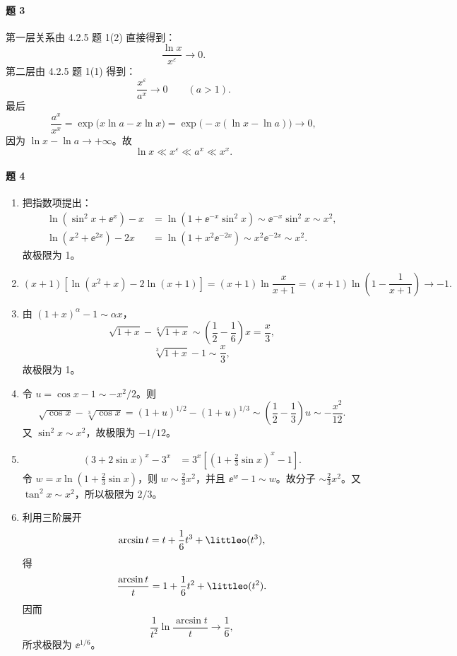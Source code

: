 \paragraph{题 3}
\begin{xsolution}
第一层关系由 4.2.5 题 1(2) 直接得到：
\[
  \frac{\ln x}{x^\varepsilon}\to0.
\]
第二层由 4.2.5 题 1(1) 得到：
\[
  \frac{x^\varepsilon}{a^x}\to0\qquad(a>1).
\]
最后
\[
  \frac{a^x}{x^x}
  =\exp\bigl(x\ln a-x\ln x\bigr)
  =\exp\bigl(-x(\ln x-\ln a)\bigr)\to0,
\]
因为 $\ln x-\ln a\to+\infty$。故
\[
  \ln x\ll x^\varepsilon\ll a^x\ll x^x.
\]
\end{xsolution}

\paragraph{题 4}
\begin{xsolution}
\begin{enumerate}[label=(\arabic*)]
  \item 把指数项提出：
  \begin{align*}
    \ln(\sin^2x+\ee^x)-x
    &=\ln(1+\ee^{-x}\sin^2x)
      \sim\ee^{-x}\sin^2x\sim x^2,\\
    \ln(x^2+\ee^{2x})-2x
    &=\ln(1+x^2\ee^{-2x})
      \sim x^2\ee^{-2x}\sim x^2.
  \end{align*}
  故极限为 1。

  \item
  \[
    (x+1)[\ln(x^2+x)-2\ln(x+1)]
    =(x+1)\ln\frac{x}{x+1}
    =(x+1)\ln\left(1-\frac1{x+1}\right)\to-1.
  \]

  \item 由 $(1+x)^\alpha-1\sim\alpha x$，
  \[
    \sqrt{1+x}-\sqrt[6]{1+x}
    \sim\left(\frac12-\frac16\right)x=\frac x3,
  \]
  \[
    \sqrt[3]{1+x}-1\sim\frac x3,
  \]
  故极限为 1。

  \item 令 $u=\cos x-1\sim-x^2/2$。则
  \[
    \sqrt{\cos x}-\sqrt[3]{\cos x}
    =(1+u)^{1/2}-(1+u)^{1/3}
    \sim\left(\frac12-\frac13\right)u
    \sim-\frac{x^2}{12}.
  \]
  又 $\sin^2x\sim x^2$，故极限为 $-1/12$。

  \item
  \begin{align*}
    (3+2\sin x)^x-3^x
    &=3^x\left[\left(1+\frac23\sin x\right)^x-1\right].
  \end{align*}
  令
  $w=x\ln(1+\frac23\sin x)$，则 $w\sim\frac23x^2$，并且 $\ee^w-1\sim w$。故分子
  $\sim\frac23x^2$。又 $\tan^2x\sim x^2$，所以极限为 $2/3$。

  \item 利用三阶展开
  \[
    \arcsin t=t+\frac16t^3+\littleo(t^3),
  \]
  得
  \[
    \frac{\arcsin t}{t}=1+\frac16t^2+\littleo(t^2).
  \]
  因而
  \[
    \frac1{t^2}\ln\frac{\arcsin t}{t}\to\frac16,
  \]
  所求极限为 $\ee^{1/6}$。
\end{enumerate}
\end{xsolution}

